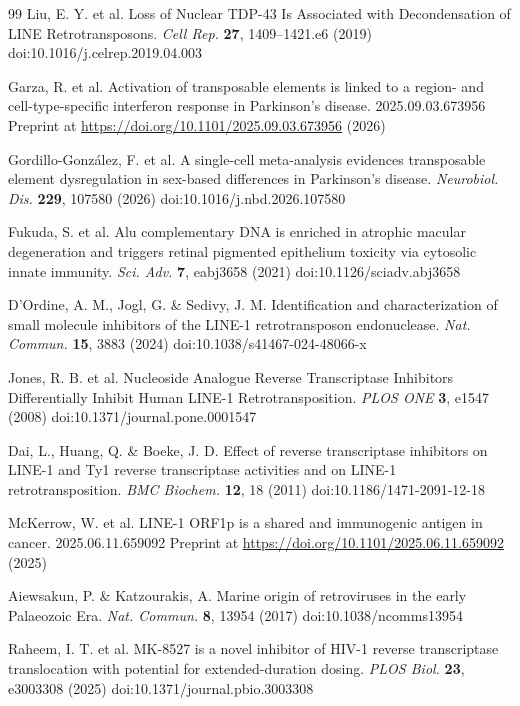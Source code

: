 \documentclass[11pt,twocolumn,twoside]{extarticle}
\begin{document}
\begin{thebibliography}{99}
 Liu, E. Y. et al. Loss of Nuclear TDP-43 Is Associated with Decondensation of LINE Retrotransposons. \textit{Cell Rep.} \textbf{27}, 1409--1421.e6 (2019) doi:10.1016/j.celrep.2019.04.003

 Garza, R. et al. Activation of transposable elements is linked to a region- and cell-type-specific interferon response in Parkinson's disease. 2025.09.03.673956 Preprint at \url{https://doi.org/10.1101/2025.09.03.673956} (2026)

 Gordillo-Gonz\'alez, F. et al. A single-cell meta-analysis evidences transposable element dysregulation in sex-based differences in Parkinson's disease. \textit{Neurobiol. Dis.} \textbf{229}, 107580 (2026) doi:10.1016/j.nbd.2026.107580

 Fukuda, S. et al. Alu complementary DNA is enriched in atrophic macular degeneration and triggers retinal pigmented epithelium toxicity via cytosolic innate immunity. \textit{Sci. Adv.} \textbf{7}, eabj3658 (2021) doi:10.1126/sciadv.abj3658

 D'Ordine, A. M., Jogl, G. \& Sedivy, J. M. Identification and characterization of small molecule inhibitors of the LINE-1 retrotransposon endonuclease. \textit{Nat. Commun.} \textbf{15}, 3883 (2024) doi:10.1038/s41467-024-48066-x

 Jones, R. B. et al. Nucleoside Analogue Reverse Transcriptase Inhibitors Differentially Inhibit Human LINE-1 Retrotransposition. \textit{PLOS ONE} \textbf{3}, e1547 (2008) doi:10.1371/journal.pone.0001547

 Dai, L., Huang, Q. \& Boeke, J. D. Effect of reverse transcriptase inhibitors on LINE-1 and Ty1 reverse transcriptase activities and on LINE-1 retrotransposition. \textit{BMC Biochem.} \textbf{12}, 18 (2011) doi:10.1186/1471-2091-12-18

 McKerrow, W. et al. LINE-1 ORF1p is a shared and immunogenic antigen in cancer. 2025.06.11.659092 Preprint at \url{https://doi.org/10.1101/2025.06.11.659092} (2025)

 Aiewsakun, P. \& Katzourakis, A. Marine origin of retroviruses in the early Palaeozoic Era. \textit{Nat. Commun.} \textbf{8}, 13954 (2017) doi:10.1038/ncomms13954

 Raheem, I. T. et al. MK-8527 is a novel inhibitor of HIV-1 reverse transcriptase translocation with potential for extended-duration dosing. \textit{PLOS Biol.} \textbf{23}, e3003308 (2025) doi:10.1371/journal.pbio.3003308


\end{thebibliography}
\end{document}
